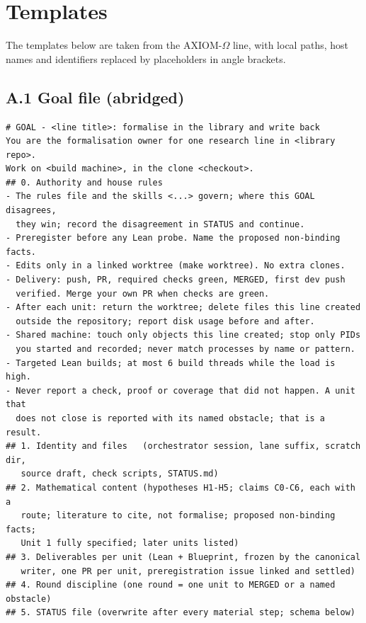 \documentclass[11pt]{article}
\begin{document}
\appendix
\section{Templates}
\label{app:templates}
The templates below are taken from the AXIOM-$\Omega$ line, with local paths,
host names and identifiers replaced by placeholders in angle brackets.

\subsection*{A.1 Goal file (abridged)}
\begin{small}
\begin{verbatim}
# GOAL - <line title>: formalise in the library and write back
You are the formalisation owner for one research line in <library repo>.
Work on <build machine>, in the clone <checkout>.
## 0. Authority and house rules
- The rules file and the skills <...> govern; where this GOAL disagrees,
  they win; record the disagreement in STATUS and continue.
- Preregister before any Lean probe. Name the proposed non-binding facts.
- Edits only in a linked worktree (make worktree). No extra clones.
- Delivery: push, PR, required checks green, MERGED, first dev push
  verified. Merge your own PR when checks are green.
- After each unit: return the worktree; delete files this line created
  outside the repository; report disk usage before and after.
- Shared machine: touch only objects this line created; stop only PIDs
  you started and recorded; never match processes by name or pattern.
- Targeted Lean builds; at most 6 build threads while the load is high.
- Never report a check, proof or coverage that did not happen. A unit that
  does not close is reported with its named obstacle; that is a result.
## 1. Identity and files   (orchestrator session, lane suffix, scratch dir,
   source draft, check scripts, STATUS.md)
## 2. Mathematical content (hypotheses H1-H5; claims C0-C6, each with a
   route; literature to cite, not formalise; proposed non-binding facts;
   Unit 1 fully specified; later units listed)
## 3. Deliverables per unit (Lean + Blueprint, frozen by the canonical
   writer, one PR per unit, preregistration issue linked and settled)
## 4. Round discipline (one round = one unit to MERGED or a named obstacle)
## 5. STATUS file (overwrite after every material step; schema below)
\end{verbatim}
\end{small}
\end{document}
